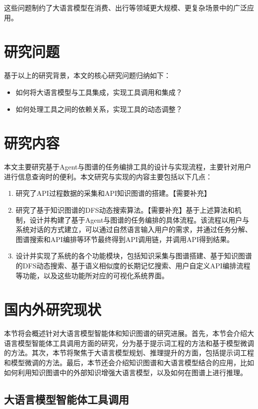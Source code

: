 这些问题制约了大语言模型在消费、出行等领域更大规模、更复杂场景中的广泛应用。

\section{研究问题}

基于以上的研究背景，本文的核心研究问题归纳如下：
\begin{itemize}
    \item 如何将大语言模型与工具集成，实现工具调用和集成？
    \item 如何处理工具之间的依赖关系，实现工具的动态调整？
\end{itemize}

\section{研究内容}
本文主要研究基于Agent与图谱的任务编排工具的设计与实现流程，主要针对用户进行信息查询时的便利。本文研究与实现的内容主要包括以下几点：

\begin{enumerate}
    \item 研究了API过程数据的采集和API知识图谱的搭建。【需要补充】
    \item 研究了基于知识图谱的DFS动态搜索算法。【需要补充】基于上述算法和机制，设计并构建了基于Agent与图谱的任务编排的具体流程。该流程以用户与系统对话的方式建立，可以通过自然语言输入用户的需求，并通过任务分解、图谱搜索和API编排等环节最终得到API调用链，并调用API得到结果。
    \item 设计并实现了系统的各个功能模块，包括知识采集与图谱搭建、基于知识图谱的DFS动态搜索、基于语义相似度的长期记忆搜索、用户自定义API编排流程等功能，以及这些功能所对应的可视化系统界面。
\end{enumerate}

\section{国内外研究现状}
本节将会概述针对大语言模型智能体和知识图谱的研究进展。首先，本节会介绍大语言模型智能体工具调用方面的研究，分为基于提示词工程的方法和基于模型微调的方法。其次，本节将聚焦于大语言模型规划、推理提升的方面，包括提示词工程和模型微调的方法。最后，本节还会介绍知识图谱和大语言模型结合的应用，比如如何利用知识图谱中的外部知识增强大语言模型，以及如何在图谱上进行推理。

\subsection{大语言模型智能体工具调用}


